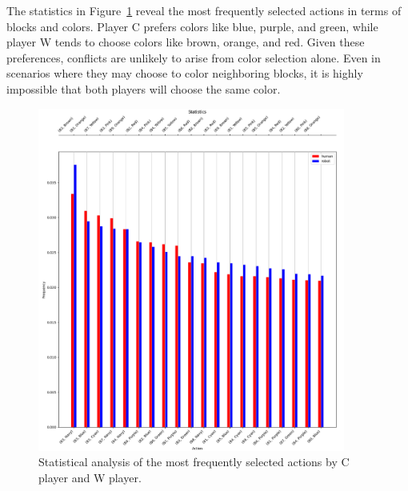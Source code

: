         \noindent
        The statistics in Figure~\ref{fig:cw-stats} reveal the most frequently selected actions in terms of blocks and colors. Player C prefers colors like blue, purple, and green, while player W tends to choose colors like brown, orange, and red. Given these preferences, conflicts are unlikely to arise from color selection alone. Even in scenarios where they may choose to color neighboring blocks, it is highly impossible that both players will choose the same color.
        \begin{figure}[H]
            \centering
            \includegraphics[width=0.9\textwidth]{images/cw-stats.png}
            \caption{Statistical analysis of the most frequently selected actions by C player and W player.}
            \label{fig:cw-stats}
        \end{figure}

